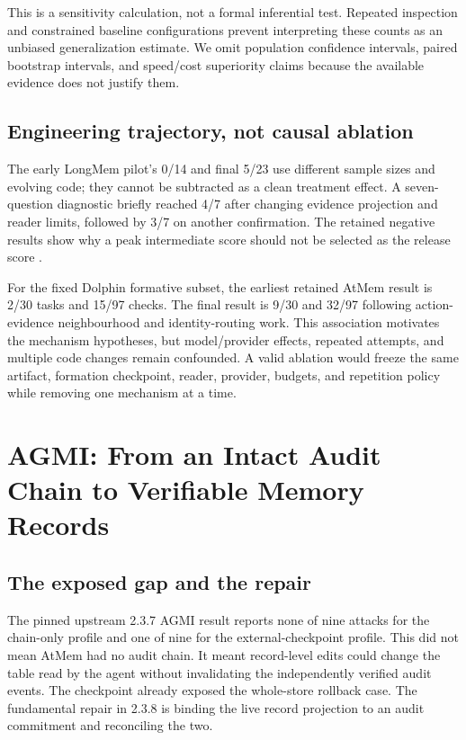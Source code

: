 \documentclass[10pt,twocolumn]{article}
\begin{document}
This is a sensitivity calculation, not a formal inferential test. Repeated inspection and constrained baseline configurations prevent interpreting these counts as an unbiased generalization estimate. We omit population confidence intervals, paired bootstrap intervals, and speed/cost superiority claims because the available evidence does not justify them.

\subsection{Engineering trajectory, not causal ablation}
The early LongMem pilot's 0/14 and final 5/23 use different sample sizes and evolving code; they cannot be subtracted as a clean treatment effect. A seven-question diagnostic briefly reached 4/7 after changing evidence projection and reader limits, followed by 3/7 on another confirmation. The retained negative results show why a peak intermediate score should not be selected as the release score \citep{history}.

For the fixed Dolphin formative subset, the earliest retained AtMem result is 2/30 tasks and 15/97 checks. The final result is 9/30 and 32/97 following action-evidence neighbourhood and identity-routing work. This association motivates the mechanism hypotheses, but model/provider effects, repeated attempts, and multiple code changes remain confounded. A valid ablation would freeze the same artifact, formation checkpoint, reader, provider, budgets, and repetition policy while removing one mechanism at a time.

\section{AGMI: From an Intact Audit Chain to Verifiable Memory Records}
\label{sec:agmi}
\subsection{The exposed gap and the repair}
The pinned upstream 2.3.7 AGMI result reports none of nine attacks for the chain-only profile and one of nine for the external-checkpoint profile. This did not mean AtMem had no audit chain. It meant record-level edits could change the table read by the agent without invalidating the independently verified audit events. The checkpoint already exposed the whole-store rollback case. The fundamental repair in 2.3.8 is binding the live record projection to an audit commitment and reconciling the two.
\end{document}
